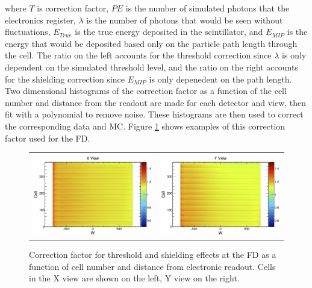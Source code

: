 \n where $T$ is correction factor, $PE$ is the number of simulated photons that the electronics register, $\lambda$ is the number of photons that would be seen without fluctuations, $E_{True}$ is the true energy deposited in the scintillator, and $E_{MIP}$ is the energy that would be deposited based only on the particle path length through the cell. The ratio on the left accounts for the threshold correction since $\lambda$ is only dependent on the simulated threshold level, and the ratio on the right accounts for the shielding correction since $E_{MIP}$ is only depenedent on the path length. Two dimensional histograms of the correction factor as a function of the cell number and distance from the readout are made for each detector and view, then fit with a polynomial to remove noise. These histograms are then used to correct the corresponding data and MC. Figure \ref{fig:CalibThreshold} shows examples of this correction factor used for the FD.
\begin{figure}[htb]
  \centering
  \begin{tabular}{c c}
    \includegraphics[width=.47\textwidth]{figures/Calib/ThresholdFDX.png} &
    \includegraphics[width=.47\textwidth]{figures/Calib/ThresholdFDY.png} \\
  \end{tabular}
  \caption[Threshold and Shielding Correction Factors]{Correction factor for threshold and shielding effects at the FD as a function of cell number and distance from electronic readout. Cells in the X view are shown on the left, Y view on the right.}
  \label{fig:CalibThreshold}
\end{figure}


